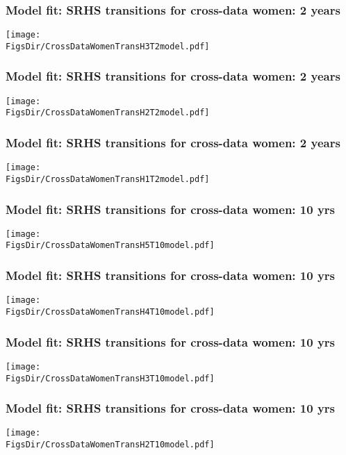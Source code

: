 \documentclass[aspectratio=169]{beamer}
\newcommand{\FigsDir}{../Figures}
\begin{document}
\begin{frame}\frametitle{Model fit: SRHS transitions for cross-data women: 2 years}
\begin{center}
\texttt{[image: \\FigsDir/CrossDataWomenTransH3T2model.pdf]}
\end{center}
\end{frame}

\begin{frame}\frametitle{Model fit: SRHS transitions for cross-data women: 2 years}
\begin{center}
\texttt{[image: \\FigsDir/CrossDataWomenTransH2T2model.pdf]}
\end{center}
\end{frame}

\begin{frame}\frametitle{Model fit: SRHS transitions for cross-data women: 2 years}
\begin{center}
\texttt{[image: \\FigsDir/CrossDataWomenTransH1T2model.pdf]}
\end{center}
\end{frame}

\begin{frame}\frametitle{Model fit: SRHS transitions for cross-data women: 10 yrs}
\begin{center}
\texttt{[image: \\FigsDir/CrossDataWomenTransH5T10model.pdf]}
\end{center}
\end{frame}

\begin{frame}\frametitle{Model fit: SRHS transitions for cross-data women: 10 yrs}
\begin{center}
\texttt{[image: \\FigsDir/CrossDataWomenTransH4T10model.pdf]}
\end{center}
\end{frame}

\begin{frame}\frametitle{Model fit: SRHS transitions for cross-data women: 10 yrs}
\begin{center}
\texttt{[image: \\FigsDir/CrossDataWomenTransH3T10model.pdf]}
\end{center}
\end{frame}

\begin{frame}\frametitle{Model fit: SRHS transitions for cross-data women: 10 yrs}
\begin{center}
\texttt{[image: \\FigsDir/CrossDataWomenTransH2T10model.pdf]}
\end{center}
\end{frame}
\end{document}
